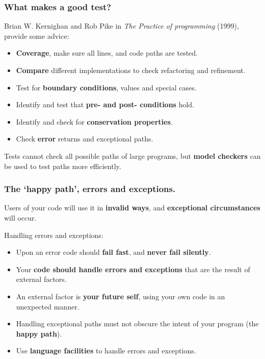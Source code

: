 \documentclass{beamer} %
\newcommand\emc[1]{\textcolor{midred}{\textbf{#1}}}
\begin{document}
\begin{frame}
\frametitle{What makes a good test?}

Brian W. Kernighan and Rob Pike in  \emph{The Practice of programming} (1999), provide some advice:
\begin{itemize}
	\item \emc{Coverage}, make sure all lines, and code paths are tested.
	\item \emc{Compare} different implementations to check refactoring and refinement.
	\item Test for \emc{boundary conditions}, values and special cases.
	\item Identify and test that \emc{pre- and post- conditions} hold.
	\item Identify and check for \emc{conservation properties}.
	\item Check \emc{error} returns and exceptional paths.
\end{itemize}

\vspace{3mm}
Tests cannot check all possible paths of large programs, but \emc{model checkers} can be used to test paths more efficiently.

\end{frame}


\begin{frame}
\frametitle{The `happy path', errors and exceptions.}

Users of your code will use it in \emc{invalid ways}, and \emc{exceptional circumstances} will occur.

\vspace{3mm}
Handling errors and exceptions:
\begin{itemize}
	\item Upon an error code should \emc{fail fast}, and \emc{never fail silently}.
	\item Your \emc{code should handle errors and exceptions} that are the result of external factors.
	\item An external factor is \emc{your future self}, using your own code in an unexpected manner.
	\item Handling exceptional paths must not obscure the intent of your program (the \emc{happy path}).
	\item Use \emc{language facilities} to handle errors and exceptions.
\end{itemize}

\end{frame}
\end{document}
